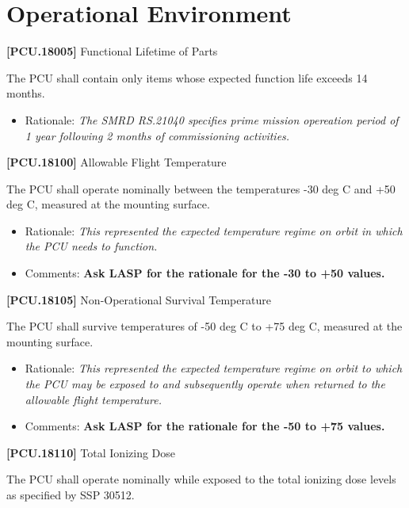 \documentclass[12pt,oneside,oldfontcommands]{memoir}
\begin{document}
\section{Operational Environment}
\label{operationalenvironment}

\textbf{[PCU.18005]} Functional Lifetime of Parts

The \gls{PCU} shall contain only items whose expected function life exceeds 14 months.

\begin{itemize}
\item{} Rationale: \emph{The SMRD RS.21040 specifies prime mission opereation period of 1 year following 2 months of commissioning activities.}

\end{itemize}

\textbf{[PCU.18100]} Allowable Flight Temperature

The \gls{PCU} shall operate nominally between the temperatures -30 deg C and +50 deg C, measured at the mounting surface.

\begin{itemize}
\item{} Rationale: \emph{This represented the expected temperature regime on orbit in which the PCU needs to function.}

\item{} Comments: \textbf{Ask LASP for the rationale for the -30 to +50 values.}

\end{itemize}

\textbf{[PCU.18105]} Non-Operational Survival Temperature

The \gls{PCU} shall survive temperatures of -50 deg C to +75 deg C, measured at the mounting surface.

\begin{itemize}
\item{} Rationale: \emph{This represented the expected temperature regime on orbit to which the PCU may be exposed to and subsequently operate when returned to the allowable flight temperature.}

\item{} Comments: \textbf{Ask LASP for the rationale for the -50 to +75 values.}

\end{itemize}

\textbf{[PCU.18110]} Total Ionizing Dose

The \gls{PCU} shall operate nominally while exposed to the total ionizing dose levels as specified by SSP 30512.
\end{document}
